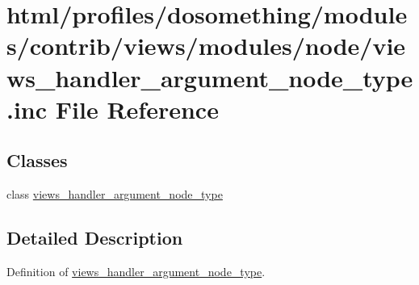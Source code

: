 \hypertarget{views__handler__argument__node__type_8inc}{
\section{html/profiles/dosomething/modules/contrib/views/modules/node/views\_\-handler\_\-argument\_\-node\_\-type.inc File Reference}
\label{views__handler__argument__node__type_8inc}
}
\subsection*{Classes}
\begin{DoxyCompactItemize}
\item 
class \hyperlink{classviews__handler__argument__node__type}{views\_\-handler\_\-argument\_\-node\_\-type}
\end{DoxyCompactItemize}


\subsection{Detailed Description}
Definition of \hyperlink{classviews__handler__argument__node__type}{views\_\-handler\_\-argument\_\-node\_\-type}. 